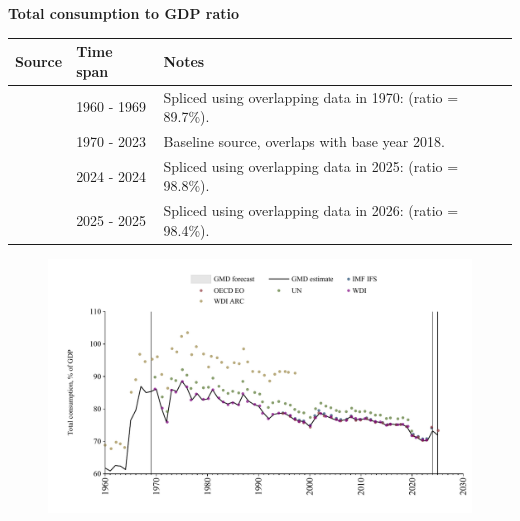 \documentclass[12pt,a4paper,landscape]{article}
\begin{document}
\begin{adjustbox}{max totalsize={\paperwidth}{\paperheight},center}
\begin{minipage}[t][\textheight][t]{\textwidth}
\vspace*{0.5cm}
{}
\begin{center}
{\Large\bfseries Total consumption to GDP ratio}
\end{center}
\vspace{0.5cm}
\begin{table}[H]
\centering
\small
\begin{tabular}{|l|l|l|}
\hline
\textbf{Source} & \textbf{Time span} & \textbf{Notes} \\
\hline
\rowcolor{white}\cite{WDI_ARC}& 1960 - 1969 &Spliced using overlapping data in 1970: (ratio = 89.7\%). \\
\rowcolor{lightgray}\cite{WDI}& 1970 - 2023 &Baseline source, overlaps with base year 2018. \\
\rowcolor{white}\cite{IMF_IFS}& 2024 - 2024 &Spliced using overlapping data in 2025: (ratio = 98.8\%). \\
\rowcolor{lightgray}\cite{OECD_EO}& 2025 - 2025 &Spliced using overlapping data in 2026: (ratio = 98.4\%). \\
\hline
\end{tabular}
\end{table}
\begin{figure}[H]
\centering
\includegraphics[width=\textwidth,height=0.6\textheight,keepaspectratio]{graphs/ISR_cons_GDP.pdf}
\end{figure}
\end{minipage}
\end{adjustbox}
\end{document}
